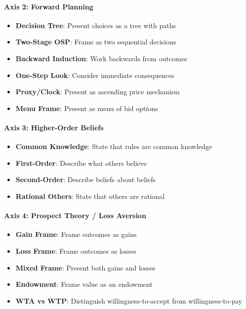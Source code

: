 \documentclass[12pt]{article}
\begin{document}
\paragraph{Axis 2: Forward Planning}
\begin{itemize}
    \item \textbf{Decision Tree}: Present choices as a tree with paths
    \item \textbf{Two-Stage OSP}: Frame as two sequential decisions
    \item \textbf{Backward Induction}: Work backwards from outcomes
    \item \textbf{One-Step Look}: Consider immediate consequences
    \item \textbf{Proxy/Clock}: Present as ascending price mechanism
    \item \textbf{Menu Frame}: Present as menu of bid options
\end{itemize}

\paragraph{Axis 3: Higher-Order Beliefs}
\begin{itemize}
    \item \textbf{Common Knowledge}: State that rules are common knowledge
    \item \textbf{First-Order}: Describe what others believe
    \item \textbf{Second-Order}: Describe beliefs about beliefs
    \item \textbf{Rational Others}: State that others are rational
\end{itemize}

\paragraph{Axis 4: Prospect Theory / Loss Aversion}
\begin{itemize}
    \item \textbf{Gain Frame}: Frame outcomes as gains
    \item \textbf{Loss Frame}: Frame outcomes as losses
    \item \textbf{Mixed Frame}: Present both gains and losses
    \item \textbf{Endowment}: Frame value as an endowment
    \item \textbf{WTA vs WTP}: Distinguish willingness-to-accept from willingness-to-pay
\end{itemize}
\end{document}
